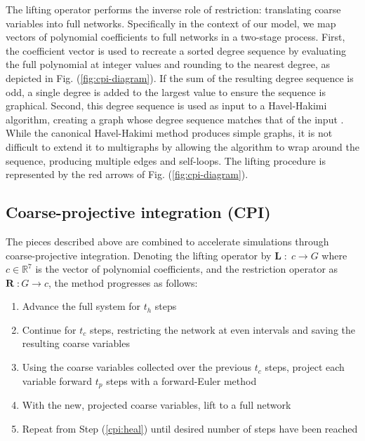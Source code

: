 \documentclass[12pt]{article}
\begin{document}
\begin{onehalfspace}
The lifting operator performs the inverse role of restriction: translating coarse variables into full networks. Specifically in the context of our model, we map vectors of polynomial coefficients to full networks in a two-stage process. First, the coefficient vector is used to recreate a sorted degree sequence by evaluating the full polynomial at integer values and rounding to the nearest degree, as depicted in Fig. (\ref{fig:cpi-diagram}). If the sum of the resulting degree sequence is odd, a single degree is added to the largest value to ensure the sequence is graphical. Second, this degree sequence is used as input to a Havel-Hakimi algorithm, creating a graph whose degree sequence matches that of the input \cite{havel_remark_1955, hakimi_realizability_1962}. While the canonical Havel-Hakimi method produces simple graphs, it is not difficult to extend it to multigraphs by allowing the algorithm to wrap around the sequence, producing multiple edges and self-loops. The lifting procedure is represented by the red arrows of Fig. (\ref{fig:cpi-diagram}).

\subsection{Coarse-projective integration (CPI)}
\label{sec:cpi}

The pieces described above are combined to accelerate simulations through coarse-projective integration. Denoting the lifting operator by $\mathbf{L} \; : \; c \rightarrow G$ where $c \in \mathbb{R}^7$ is the vector of polynomial coefficients, and the restriction operator as $\mathbf{R} \; : G \rightarrow c$, the method progresses as follows:

\begin{enumerate}
\item Advance the full system for $t_h$ steps
\label{cpi:heal}
\item Continue for $t_c$ steps, restricting the network at even intervals and saving the resulting coarse variables
\item Using the coarse variables collected over the previous $t_c$ steps, project each variable forward $t_p$ steps with a forward-Euler method
\label{cpi:proj}
\item With the new, projected coarse variables, lift to a full network
\label{cpi:init}
\item Repeat from Step (\ref{cpi:heal}) until desired number of steps have been reached
\end{enumerate}


\end{onehalfspace}
\end{document}
